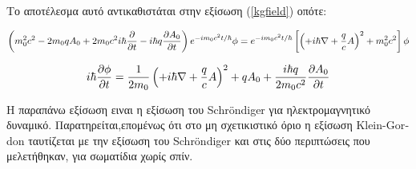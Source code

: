 Το αποτέλεσμα αυτό αντικαθιστάται στην εξίσωση (\ref{kgfield}) οπότε: 

\[
  \left(  m_0^2c^2-2m_0 q A_0 +2 m_0 c^2 i \hbar \frac{\partial }{\partial t} -i\hbar q \frac{\partial A_0}{\partial t} \right)  e^{-im_0c^2 t/\hbar } \phi =e^{-im_0c^2 t/\hbar } \left[  \left(  +i\hbar \nabla +\frac{q}{c} A\right)  ^2 +m_0^2 c^2 \right]  \phi
\]
\vspace{0.5cm}
\begin{mdframed}
  \[
   i\hbar \frac{\partial \phi}{\partial t} =\frac{1}{2 m_0}\left(  +i\hbar \nabla +\frac{q}{c} A\right)  ^2 +q A_0+\frac{i\hbar q}{2m_0 c^2} \frac{\partial A_0}{\partial t} 
   \]
\end{mdframed}
\vspace{0.5cm}
Η παραπάνω εξίσωση ειναι η εξίσωση του \textlatin{Schr\"ondiger} για ηλεκτρομαγνητικό δυναμικό. Παρατηρείται,επομένως ότι στο μη σχετικιστικό όριο η εξίσωση \textlatin{Klein-Gordon} ταυτίζεται με την εξίσωση του \textlatin{Schr\"ondiger} και στις δύο περιπτώσεις που μελετήθηκαν, για σωματίδια χωρίς σπίν.

